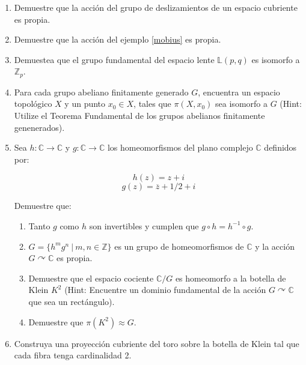 \begin{enumerate}
\item Demuestre que la acci\'on del grupo de deslizamientos de un espacio cubriente es propia.\\

\item Demuestre que la acci\'on del ejemplo \ref{mobius} es propia.\\

\item Demuestea que el grupo fundamental del espacio lente $\mathbb{L}(p,q)$ es isomorfo a $\mathbb Z_p$.\\

\item Para cada grupo abeliano finitamente generado $G$, encuentra un espacio topol\'ogico $X$ y un punto $x_0 \in X$, tales que $\pi(X,x_0)$ sea isomorfo a $G$ (Hint: Utilize el Teorema Fundamental de los grupos abelianos finitamente genenerados).\\

\item Sea $h: \mathbb{C} \rightarrow \mathbb{C}$ y $g: \mathbb{C} \rightarrow \mathbb{C}$ los homeomorfismos del plano complejo $\mathbb{C}$ definidos por:

$$h(z)=z+i$$
$$g(z)=\overline{z}+1/2+i$$

Demuestre que:

 \begin{enumerate}

\item Tanto $g$ como $h$ son invertibles y cumplen que $g \circ h = h^{-1} \circ g$.\\

\item $G=\lbrace h^m g^n \: | \: m,n \in \mathbb{Z} \rbrace$ es un grupo de homeomorfismos de $\mathbb{C}$ y la acci\'on $G \curvearrowright \mathbb{C}$ es propia.\\

\item Demuestre que el espacio cociente $\mathbb{C}/G$ es homeomorfo a la botella de Klein $K^2$ (Hint: Encuentre un dominio fundamental de la acci\'on $G \curvearrowright \mathbb{C}$ que sea un rect\'angulo).\\

\item Demuestre que $\pi(K^2) \approx G$.\\ 

 \end{enumerate}

\item Construya una proyecci\'on cubriente del toro sobre la botella de Klein tal que cada fibra
tenga cardinalidad 2.\\


\end{enumerate}
